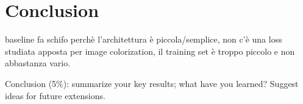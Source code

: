 \section{Conclusion}
baseline fa schifo perchè l'architettura è piccola/semplice, non c'è una loss studiata apposta per image colorization, il training set è troppo piccolo e non abbastanza vario.


Conclusion (5\%): summarize your key results; what have you learned? Suggest ideas for future extensions.
